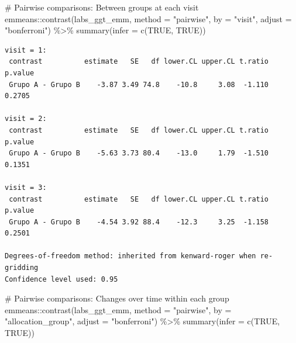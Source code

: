 \documentclass[
  letterpaper,
  DIV=11,
  numbers=noendperiod]{scrartcl}
\newenvironment{Shaded}{\begin{snugshade}}{\end{snugshade}}
\newcommand{\AttributeTok}[1]{\textcolor[rgb]{0.40,0.45,0.13}{#1}}
\newcommand{\CommentTok}[1]{\textcolor[rgb]{0.37,0.37,0.37}{#1}}
\newcommand{\ConstantTok}[1]{\textcolor[rgb]{0.56,0.35,0.01}{#1}}
\newcommand{\FunctionTok}[1]{\textcolor[rgb]{0.28,0.35,0.67}{#1}}
\newcommand{\NormalTok}[1]{\textcolor[rgb]{0.00,0.23,0.31}{#1}}
\newcommand{\SpecialCharTok}[1]{\textcolor[rgb]{0.37,0.37,0.37}{#1}}
\newcommand{\StringTok}[1]{\textcolor[rgb]{0.13,0.47,0.30}{#1}}
\begin{document}
\begin{Shaded}
\begin{Highlighting}[]
\CommentTok{\# Pairwise comparisons: Between groups at each visit}
\NormalTok{emmeans}\SpecialCharTok{::}\FunctionTok{contrast}\NormalTok{(labs\_ggt\_emm, }\AttributeTok{method =} \StringTok{"pairwise"}\NormalTok{, }\AttributeTok{by =} \StringTok{"visit"}\NormalTok{, }\AttributeTok{adjust =} \StringTok{"bonferroni"}\NormalTok{) }\SpecialCharTok{\%\textgreater{}\%} \FunctionTok{summary}\NormalTok{(}\AttributeTok{infer =} \FunctionTok{c}\NormalTok{(}\ConstantTok{TRUE}\NormalTok{, }\ConstantTok{TRUE}\NormalTok{))}
\end{Highlighting}
\end{Shaded}

\begin{verbatim}
visit = 1:
 contrast          estimate   SE   df lower.CL upper.CL t.ratio p.value
 Grupo A - Grupo B    -3.87 3.49 74.8    -10.8     3.08  -1.110  0.2705

visit = 2:
 contrast          estimate   SE   df lower.CL upper.CL t.ratio p.value
 Grupo A - Grupo B    -5.63 3.73 80.4    -13.0     1.79  -1.510  0.1351

visit = 3:
 contrast          estimate   SE   df lower.CL upper.CL t.ratio p.value
 Grupo A - Grupo B    -4.54 3.92 88.4    -12.3     3.25  -1.158  0.2501

Degrees-of-freedom method: inherited from kenward-roger when re-gridding 
Confidence level used: 0.95 
\end{verbatim}

\begin{Shaded}
\begin{Highlighting}[]
\CommentTok{\# Pairwise comparisons: Changes over time within each group}
\NormalTok{emmeans}\SpecialCharTok{::}\FunctionTok{contrast}\NormalTok{(labs\_ggt\_emm, }\AttributeTok{method =} \StringTok{"pairwise"}\NormalTok{, }\AttributeTok{by =} \StringTok{"allocation\_group"}\NormalTok{, }\AttributeTok{adjust =} \StringTok{"bonferroni"}\NormalTok{) }\SpecialCharTok{\%\textgreater{}\%} \FunctionTok{summary}\NormalTok{(}\AttributeTok{infer =} \FunctionTok{c}\NormalTok{(}\ConstantTok{TRUE}\NormalTok{, }\ConstantTok{TRUE}\NormalTok{))}
\end{Highlighting}
\end{Shaded}
\end{document}
